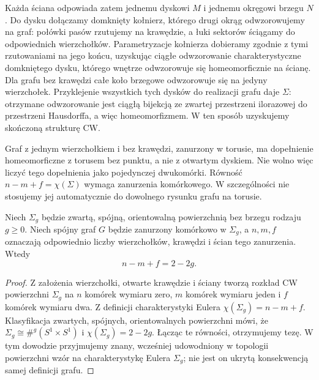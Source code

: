 Każda ściana odpowiada zatem jednemu dyskowi $M$ i jednemu
okręgowi brzegu $N$. Do dysku dołączamy domknięty
kołnierz, którego drugi okrąg odwzorowujemy na graf:
połówki pasów rzutujemy na krawędzie, a łuki sektorów
ściągamy do odpowiednich wierzchołków. Parametryzacje
kołnierza dobieramy zgodnie z tymi rzutowaniami na jego
końcu, uzyskując ciągłe odwzorowanie charakterystyczne
domkniętego dysku, którego wnętrze odwzorowuje się
homeomorficznie na ścianę. Dla grafu bez krawędzi
całe koło brzegowe odwzorowuje się na jedyny wierzchołek.
Przyklejenie wszystkich tych dysków do realizacji grafu
daje $\Sigma$: otrzymane odwzorowanie jest ciągłą
bijekcją ze zwartej przestrzeni ilorazowej do przestrzeni
Hausdorffa, a więc homeomorfizmem.
W ten sposób uzyskujemy skończoną strukturę CW.

\begin{uwaga}
Graf z jednym wierzchołkiem i bez krawędzi, zanurzony w torusie, ma dopełnienie
homeomorficzne z torusem bez punktu, a nie z otwartym dyskiem.
Nie wolno więc liczyć tego dopełnienia jako pojedynczej
dwukomórki. Równość $n-m+f=\chi(\Sigma)$ wymaga
zanurzenia komórkowego. W szczególności nie stosujemy jej
automatycznie do dowolnego rysunku grafu na torusie.
\end{uwaga}

\begin{twierdzenie}
\label{thm:tg-surface-euler}
Niech $\Sigma_g$ będzie zwartą, spójną, orientowalną powierzchnią
bez brzegu rodzaju $g\ge0$. Niech spójny graf $G$ będzie
zanurzony komórkowo w $\Sigma_g$, a $n,m,f$ oznaczają
odpowiednio liczby wierzchołków, krawędzi i ścian tego zanurzenia.
Wtedy
\[
 n-m+f=2-2g.
\]
\end{twierdzenie}

\begin{proof}
Z założenia wierzchołki, otwarte krawędzie i ściany
tworzą rozkład CW powierzchni $\Sigma_g$ na $n$
komórek wymiaru zero, $m$ komórek wymiaru jeden i $f$
komórek wymiaru dwa. Z definicji charakterystyki Eulera
$\chi(\Sigma_g)=n-m+f$. Klasyfikacja zwartych, spójnych,
orientowalnych powierzchni mówi, że
$\Sigma_g\cong\#^g(S^1\times S^1)$ i
$\chi(\Sigma_g)=2-2g$. Łącząc te równości,
otrzymujemy tezę. W tym dowodzie przyjmujemy znany,
wcześniej udowodniony w topologii powierzchni wzór
na charakterystykę Eulera \(\Sigma_g\); nie jest on
ukrytą konsekwencją samej definicji grafu.
\end{proof}

